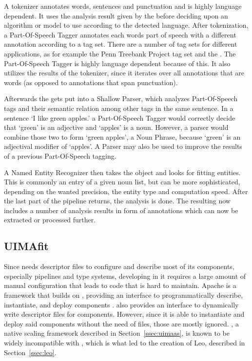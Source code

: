 A tokenizer annotates words, sentences and punctuation and is highly language dependent. It uses the analysis result given by the \anen{} before deciding upon an algorithm or model to use according to the detected language. After tokenization, a Part-Of-Speech Tagger annotates each words part of speech with a different annotation according to a tag set. There are a number of tag sets for different applications, as for example the Penn Treebank Project tag set and the \stts{}. The Part-Of-Speech Tagger is highly language dependent because of this. It also utilizes the results of the tokenizer, since it iterates over all annotations that are words (as opposed to annotations that span punctuation).

Afterwards the \cas{} gets put into a Shallow Parser, which analyzes Part-Of-Speech tags and their semantic relation among other tags in the same sentence. In a sentence `I like green apples.' a Part-Of-Speech Tagger would correctly decide that `green' is an adjective and `apples' is a noun. However, a parser would combine those two to form `green apples', a Noun Phrase, because `green' is an adjectival modifier of `apples'. A Parser may also be used to improve the results of a previous Part-Of-Speech tagging.

A Named Entity Recognizer then takes the \cas{} object and looks for fitting entities. This is commonly an entry of a given noun list, but can be more sophisticated, depending on the wanted precision, the entity type and computation speed. After the last part of the pipeline returns, the analysis is done. The resulting \cas{} now includes a number of analysis results in form of annotations which can now be extracted or processed further.

\subsection{UIMAfit}
\label{ssec:uimafit}
Since \uima{} needs \xml{} descriptor files to configure and describe most of its components, especially pipelines and type systems, developing in it requires a large amount of manual \xml{} configuration that leads to code that is hard to maintain. Apache \uimafit{} is a framework that builds on \uima{}, providing an interface to programmatically describe, instantiate, and deploy \uima{} components \cite{ogren-bethard:2009:SETQA-NLP}. \uimafit{} also provides an interface to dynamically write \xml{} descriptor files for \uima{} components. However, since it is able to instantiate and deploy said components without the need of \xml{} files, those are mostly ignored. \uimaas{}, a native \uima{} scaling framework described in Section~\ref{ssec:uimaas}, is known to be widely incompatible with \uimafit{}, which is what led to the creation of Leo, described in Section~\ref{ssec:leo}.

